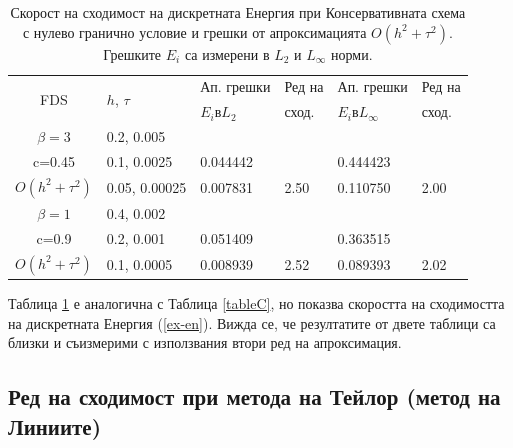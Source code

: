 \documentclass{article}
\newcommand{\rf}[1]{(\ref{#1})}
\begin{document}
\begin{table}[ht]
\centering
\small
		\begin{tabular}{||c|l|ll|ll||}
			\hline
			\hline
      \multirow{2  }{*}{FDS}        & \multirow{2  }{*}{$h$, $\tau$}  & Ап. грешки      &Ред на& Ап. грешки        &Ред на   \\
	                                        &                                                     &  $E_i$в$L_2$ &  сход. & $E_i$в$L_\infty$  & сход. \\
   			\hline 
					\hline 
  $\beta=3$                &0.2, 0.005         &                    &                &                  &                   \\
   c=0.45                     &0.1, 0.0025         & 0.044442   &                & 0.444423  &                   \\
     $O(h^2 + \tau^ 2)$ &0.05, 0.00025  & 0.007831   & 2.50       & 0.110750  & 2.00   \\
	   \hline
			\hline 
       $\beta=1$           & 0.4, 0.002       &                   &           &                 &   \\
                  c=0.9       & 0.2, 0.001        & 0.051409   &          &0.363515  &   \\
  $O(h^2+ \tau^2)$  & 0.1, 0.0005       & 0.008939   & 2.52  &0.089393  & 2.02  \\
	   \hline
			\hline 
		\end{tabular}
		\caption{Скорост на сходимост на дискретната Енергия при Консервативната схема с нулево гранично условие и грешки от апроксимацията $O(h^{2} + \tau^2 )$. Грешките $E_i$ са измерени в $L_2$ и $L_\infty$ норми.}
\label{tableD}
\end{table}

Таблица \ref{tableD} е аналогична с Таблица \ref{tableC}, но показва скоростта на сходимостта на дискретната Енергия \rf{ex-en}. Вижда се, че резултатите от двете таблици са близки и съизмерими с използвания втори ред на апроксимация.

\subsection{Ред на сходимост при метода на Тейлор (метод на Линиите)}
\end{document}
